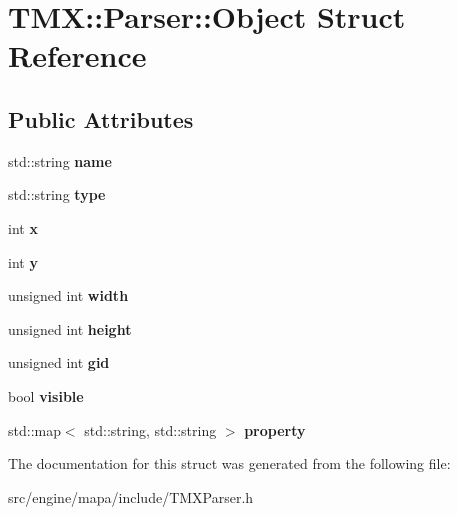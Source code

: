 \hypertarget{struct_t_m_x_1_1_parser_1_1_object}{}\section{T\+MX\+:\+:Parser\+:\+:Object Struct Reference}
\label{struct_t_m_x_1_1_parser_1_1_object}
\subsection*{Public Attributes}
\begin{DoxyCompactItemize}
\item 
std\+::string {\bfseries name}\hypertarget{struct_t_m_x_1_1_parser_1_1_object_a82e89d82472ce8ffd79a4d5416030014}{}\label{struct_t_m_x_1_1_parser_1_1_object_a82e89d82472ce8ffd79a4d5416030014}

\item 
std\+::string {\bfseries type}\hypertarget{struct_t_m_x_1_1_parser_1_1_object_a2047701de3c71d0ef97739ce67ef2e28}{}\label{struct_t_m_x_1_1_parser_1_1_object_a2047701de3c71d0ef97739ce67ef2e28}

\item 
int {\bfseries x}\hypertarget{struct_t_m_x_1_1_parser_1_1_object_a68cd3f6800cf6b99c87f506ecf7e1bd7}{}\label{struct_t_m_x_1_1_parser_1_1_object_a68cd3f6800cf6b99c87f506ecf7e1bd7}

\item 
int {\bfseries y}\hypertarget{struct_t_m_x_1_1_parser_1_1_object_ad7987b197e5f0b729ac0e2d5d2ea4bb7}{}\label{struct_t_m_x_1_1_parser_1_1_object_ad7987b197e5f0b729ac0e2d5d2ea4bb7}

\item 
unsigned int {\bfseries width}\hypertarget{struct_t_m_x_1_1_parser_1_1_object_ac0db6b008a312092cafd66fdb06e0700}{}\label{struct_t_m_x_1_1_parser_1_1_object_ac0db6b008a312092cafd66fdb06e0700}

\item 
unsigned int {\bfseries height}\hypertarget{struct_t_m_x_1_1_parser_1_1_object_ac406838116789fb28441785bc2634502}{}\label{struct_t_m_x_1_1_parser_1_1_object_ac406838116789fb28441785bc2634502}

\item 
unsigned int {\bfseries gid}\hypertarget{struct_t_m_x_1_1_parser_1_1_object_abca4500365a7ec2372168cb877f46951}{}\label{struct_t_m_x_1_1_parser_1_1_object_abca4500365a7ec2372168cb877f46951}

\item 
bool {\bfseries visible}\hypertarget{struct_t_m_x_1_1_parser_1_1_object_ab0c77962bd146f7708ed469fdf516596}{}\label{struct_t_m_x_1_1_parser_1_1_object_ab0c77962bd146f7708ed469fdf516596}

\item 
std\+::map$<$ std\+::string, std\+::string $>$ {\bfseries property}\hypertarget{struct_t_m_x_1_1_parser_1_1_object_afc19fdfd14df604717452fabd6858b2e}{}\label{struct_t_m_x_1_1_parser_1_1_object_afc19fdfd14df604717452fabd6858b2e}

\end{DoxyCompactItemize}


The documentation for this struct was generated from the following file\+:\begin{DoxyCompactItemize}
\item 
src/engine/mapa/include/T\+M\+X\+Parser.\+h\end{DoxyCompactItemize}
